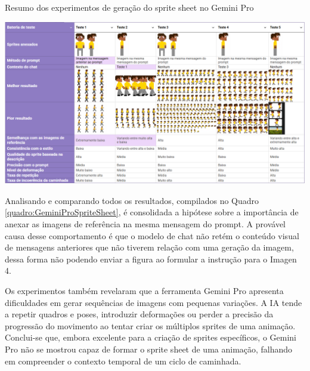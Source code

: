 \begin{quadro}[htbp]
    \centering
    \caption{\small Resumo dos experimentos de geração do sprite sheet no Gemini Pro}
    \label{quadro:GeminiProSpriteSheet}
    \includegraphics[width=1\linewidth]{figs/geminiPro/tabela_geracao_sprite_sheet.PNG}
\end{quadro}


Analisando e comparando todos os resultados, compilados no Quadro \ref{quadro:GeminiProSpriteSheet}, é consolidada a hipótese sobre a importância de anexar as imagens de referência na mesma mensagem do prompt. A provável causa desse comportamento é que o modelo de chat não retém o conteúdo visual de mensagens anteriores que não tiverem relação com uma geração da imagem, dessa forma não podendo enviar a figura ao formular a instrução para o Imagen 4.

Os experimentos também revelaram que a ferramenta Gemini Pro apresenta dificuldades em gerar sequências de imagens com pequenas variações. A IA tende a repetir quadros e poses, introduzir deformações ou perder a precisão da progressão do movimento ao tentar criar os múltiplos sprites de uma animação. Conclui-se que, embora excelente para a criação de sprites específicos, o Gemini Pro não se mostrou capaz de formar o sprite sheet de uma animação, falhando em compreender o contexto temporal de um ciclo de caminhada.

